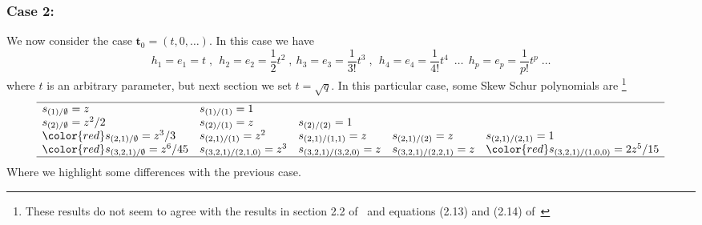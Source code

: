 \subsubsection{Case 2:} We now consider the case
\(\mathbf{t}_0=(t, 0, \dots)\). In this case we have
\begin{equation}
h_1=e_1=t\; , \ \ h_2=e_2= \frac{1}{2} t^2 \; , \ h_3=e_3 =
\frac{1}{3!} t^3 \; , \ \ h_4 =e_4 = \frac{1}{4!} t^4 \; \ \dots
\ \ h_p = e_p = \frac{1}{p!} t^p \; \dots
\end{equation}
where \(t\) is an arbitrary parameter, but next section we set
\(t=\sqrt{q}\). In this particular case, some Skew Schur polynomials are
\footnote{These results do not seem to agree with the results in
section 2.2 of~\cite{okounkov2003symmetric} and  
equations (2.13) and (2.14) of~\cite{Maeda:2004is}}
\[
\begin{array}{lllll}
  \hline
    s_{(1)/\emptyset} = z   & s_{(1)/(1)} = 1 &&&	\\
    s_{(2)/\emptyset} = z^2/2 & s_{(2)/(1)} = z & s_{(2)/(2)} = 1 &\\  
    {\color{red} s_{(2,1)/\emptyset} = z^3/3} &
      s_{(2,1)/(1)} = z^2 & s_{(2,1)/(1,1)}=z  & s_{(2,1)/(2)}=z & s_{(2,1)/(2,1)}=1  \\ 
    {\color{red} s_{(3,2,1)/\emptyset} = z^6/45} & s_{(3,2,1)/(2,1,0)} = z^3
      & s_{(3,2,1)/(3,2,0)}=z & s_{(3,2,1)/(2,2,1)}= z &
    {\color{red} s_{(3,2,1)/(1,0,0)}= 2 z^5 / 15} \\ 
  \hline
\end{array}
\]
Where we highlight some differences with the previous case. 


